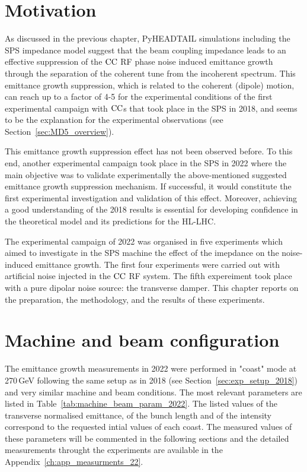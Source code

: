 \section{Motivation}\label{sec:motivation_md_2022}
As discussed in the previous chapter, PyHEADTAIL simulations including the SPS impedance model suggest that the beam coupling impedance leads to an effective suppression of the ${\mathrm{CC}}$ RF phase noise induced emittance growth through the separation of the coherent tune from the incoherent spectrum. This emittance growth suppression, which is related to the coherent (dipole) motion, can reach up to a factor of 4-5 for the experimental conditions of the first experimental campaign with ${\mathrm{CC}}$s that took place in the SPS in 2018, and seems to be the explanation for the experimental observations (see Section~\ref{sec:MD5_overview}).

This emittance growth suppression effect has not been observed before. To this end, another experimental campaign took place in the SPS in 2022 where the main objective was to validate experimentally the above-mentioned suggested emittance growth suppression mechanism. If successful, it would constitute the first experimental investigation and validation of this effect. Moreover, achieving a good understanding of the 2018 results is essential for developing confidence in the theoretical model and its predictions for the HL-LHC.

The experimental campaign of 2022 was organised in five experiments which aimed to investigate in the SPS machine the effect of the imepdance on the noise-induced emittance growth. The first four experiments were carried out with artificial noise injected in the ${\mathrm{CC}}$ RF system. The fifth expereiment took place with a pure dipolar noise source: the transverse damper. This chapter reports on the preparation, the methodology, and the results of these experiments.



\section{Machine and beam configuration}\label{sec:cc_md_2022_parameters}
The emittance growth measurements in 2022 were performed in "coast" mode at 270\,GeV following the same setup as in 2018 (see Section~\ref{sec:exp_setup_2018}) and very similar machine and beam conditions. The most relevant parameters are listed in Table~\ref{tab:machine_beam_param_2022}. The listed values of the transverse normalised emittance, of the bunch length and of the intensity correspond to the requested intial values of each coast. The measured values of these parameters will be commented in the following sections and the detailed measurements throught the experiments are available in the Appendix~\ref{ch:app_measurments_22}. 

